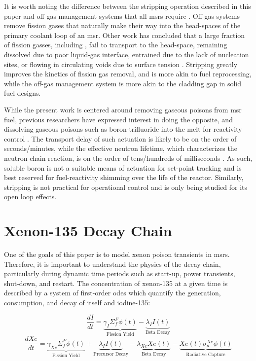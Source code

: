 It is worth noting the difference between the stripping operation described in this paper and off-gas management systems that all \acsp{msr} require \cite{Offgas}. Off-gas systems remove fission gases that naturally make their way into the head-spaces of the primary coolant loop of an \acs{msr}. Other work has concluded that a large fraction of fission gasses, including \Xe, fail to transport to the head-space, remaining dissolved due to poor liquid-gas interface, entrained due to the lack of nucleation sites, or flowing in circulating voids due to surface tension \cite{XeMSR}. Stripping greatly improves the kinetics of fission gas removal, and is more akin to fuel reprocessing, while the off-gas management system is more akin to the cladding gap in solid fuel designs.

While the present work is centered around removing gaseous poisons from \acs{msr} fuel, previous researchers have expressed interest in doing the opposite, and dissolving gaseous poisons such as boron-trifluoride into the melt for reactivity control \cite{BF3}. The transport delay of such actuation is likely to be on the order of seconds/minutes, while the effective neutron lifetime, which characterizes the neutron chain reaction, is on the order of tens/hundreds of milliseconds \cite[Ch. 1]{DH}. As such, soluble boron is not a suitable means of actuation for set-point tracking and is best reserved for fuel-reactivity shimming over the life of the reactor. Similarly, \Xe stripping is not practical for operational control and is only being studied for its open loop effects.

\section{Xenon-135 Decay Chain}\label{sec-decay}
One of the goals of this paper is to model xenon poison transients in \acsp{msr}. Therefore, it is important to understand the physics of the decay chain, particularly during dynamic time periods such as start-up, power transients, shut-down, and restart. The concentration of xenon-135 at a given time is described by a system of first-order \acfp{ode} which quantify the generation, consumption, and decay of itself and iodine-135:

\begin{equation}\label{eq:diffI}
    \frac{dI}{dt} =
    \underbrace{\gamma_{I}\Sigma_{f}^{F}{\phi}(t)}_{\text{Fission Yield}}
    -\underbrace{\lambda_{I}I(t)}_{\text{Beta Decay}}
\end{equation}
\begin{equation}\label{eq:diffXe}
        \frac{dXe}{dt} =
        \underbrace{\gamma_{Xe}\Sigma_{f}^{F}{\phi}(t)}_{\text{Fission Yield}}
        +
        \underbrace{\lambda_{I}I(t)}_{\text{Precursor Decay}}
        -\underbrace{\lambda_{Xe}Xe(t)}_{\text{Beta Decay}}
        -\underbrace{Xe(t)\sigma_{a}^{Xe}{\phi}(t)}_{\text{Radiative Capture}}
\end{equation}


